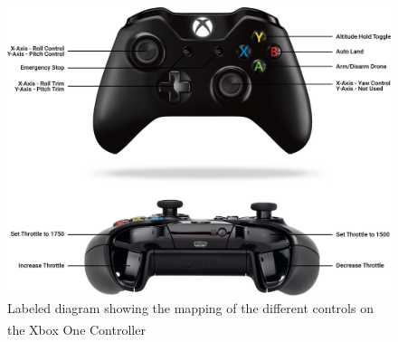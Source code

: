 \documentclass[a4paper,12pt,oneside]{book}
\begin{document}
\begin{figure}[!htb]
\centering
\includegraphics[width=\textwidth]{images/joystick_controls}
\caption{Labeled diagram showing the mapping of the different controls on the Xbox\textsuperscript{\textregistered} One Controller\cite{xbox}}
\label{fig:joycon}
\end{figure}

\bigskip
\end{document}
